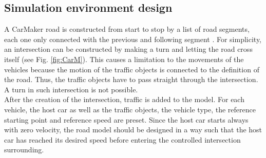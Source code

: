 \documentclass[letterpaper,10pt,conference]{ieeeconf}
\begin{document}
\subsection{Simulation environment design}
A CarMaker road is constructed from start to stop by a list of road segments, each one only connected with the previous and following segment \cite{guide}. For simplicity, an intersection can be constructed by making a turn and letting the road cross itself (see Fig. \ref{fig:CarM}). This causes a limitation to the movements of the vehicles because the motion of the traffic objects is connected to the definition of the road. Thus, the traffic objects have to pass straight through the intersection. A turn in such intersection is not possible.\\ \indent
After the creation of the intersection, traffic is added to the model. For each vehicle, the host car as well as the traffic objects, the vehicle type, the reference starting point and reference speed are preset. Since the host car starts always with zero velocity, the road model should be designed in a way such that the host car has reached its desired speed before entering the controlled intersection surrounding.
\end{document}
